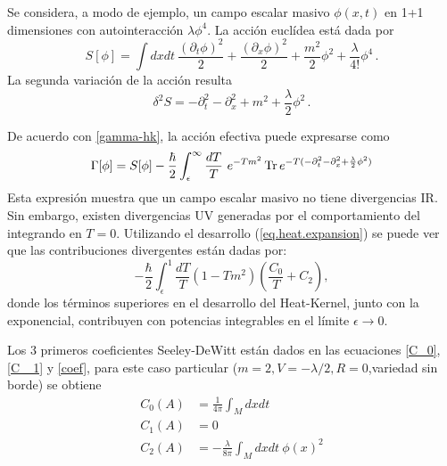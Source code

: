 Se considera, a modo de ejemplo, un campo escalar masivo $\phi(x,t)$ en 1+1 dimensiones con autointeracción $\lambda \phi ^4 $. La acción euclídea está dada por
\begin{equation}
S[ \phi ] = \int dx dt \ 
\frac{( \partial _t \phi ) ^2}{2} +  
\frac{( \partial _x \phi ) ^2}{2} +
\frac{m ^2 }{2} \phi ^2 +
\frac{\lambda}{4!} \phi ^4 \,.
\end{equation}
La segunda variación de la acción resulta
\begin{equation}
\delta ^2 S = 
- \partial _t ^2 
- \partial _x ^2 
+ m ^2 
+ \frac{\lambda}{2}\phi ^2 \,.
\end{equation}


De acuerdo con \eqref{gamma-hk}, la acción efectiva puede expresarse como
\begin{equation}\label{eq.accion-efectiva}
\Gamma [ \phi ] = 
S[ \phi ] - 
\frac{\hbar }{2}
\int _ { \epsilon } ^{\infty} \frac{ dT}{T} 
\ e ^{- T m ^2 }
\,{\rm Tr} \,  e ^{- T ( - \partial _t ^2 - \partial _x ^2 + \frac{\lambda}{2} \phi ^2 ) }
\end{equation}
Esta expresión muestra que un campo escalar masivo no tiene divergencias IR. Sin embargo, existen divergencias UV generadas por el comportamiento del integrando en $T=0$. Utilizando el desarrollo (\ref{eq.heat.expansion}) se puede ver que las contribuciones divergentes están dadas por:
\begin{equation}\label{seeley-div}
- \frac{\hbar }{2}\int _ { \epsilon } ^{1}  
\frac{ dT}{T} 
\left(
		1 - T m^2
		\right)
\left(
		\frac{C _0}{T} + C _2 
		\right),
\end{equation}
donde los términos superiores en el  desarrollo del Heat-Kernel, junto con la exponencial, contribuyen con potencias integrables en el límite $\epsilon \rightarrow 0 $.

Los 3 primeros coeficientes Seeley-DeWitt están dados en las ecuaciones \eqref{C_0}, \eqref{C _1} y \eqref{coef}, para este caso particular ($m=2, V = - \lambda /2,R=0$,variedad sin borde) se obtiene
\begin{align}
C _0 (A) &= \frac{1}{4 \pi   }  \int  _{M} d x dt   \\[2mm]
C _1 (A) &= 0 \\[2mm]
C _2 (A) &= - \frac{ \lambda }{8 \pi }  \int _M d x dt \  \phi (x) ^2
\label{coef2}
\end{align} 


